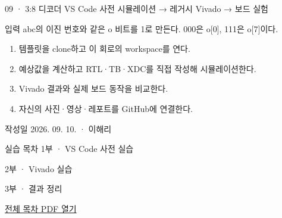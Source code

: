 
\renewcommand{\labonehome}{\hyperlink{legacy-09-contents}{\contentsbutton}}
\renewcommand{\legacySource}[1]{}
\providecommand{\terminalbox}[1]{\par\vspace{0.15cm}{\setlength{\fboxsep}{7pt}\colorbox{black}{\parbox{\dimexpr\textwidth-14pt\relax}{\color{white}\ttfamily\fontsize{7}{9}\selectfont #1}}}\par\vspace{0.15cm}}

\begingroup
\renewcommand{\small}{\fontsize{9}{11}\selectfont}
\begin{frame}{09 · 3:8 디코더}\relax
\small
VS Code 사전 시뮬레이션 → 레거시 Vivado → 보드 실험\par\vspace{0.22cm}입력 abc의 이진 번호와 같은 o 비트를 1로 만든다. 000은 o[0], 111은 o[7]이다.\par\begin{enumerate}\setlength{\itemsep}{0.22cm}
\item 템플릿을 clone하고 이 회로의 workspace를 연다.
\item 예상값을 계산하고 RTL·TB·XDC를 직접 작성해 시뮬레이션한다.
\item Vivado 결과와 실제 보드 동작을 비교한다.
\item 자신의 사진·영상·레포트를 GitHub에 연결한다.
\end{enumerate}
작성일 2026. 09. 10. · 이해리\par
\end{frame}

\begin{frame}[label=legacy-09-contents]{실습 목차}\relax
\small
1부 · VS Code 사전 실습\par{}\par\vspace{0.2cm}
\par\vspace{0.4cm}
2부 · Vivado 실습\par{}\par\vspace{0.4cm}
3부 · 결과 정리\par{}\par\vspace{0.35cm}
\href{04.LAB1_00_CONTENTS.pdf}{전체 목차 PDF 열기}
\end{frame}

